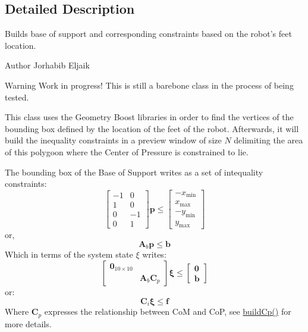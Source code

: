 \subsection{\-Detailed \-Description}
\-Builds base of support and corresponding constraints based on the robot's feet location. 

\begin{DoxyAuthor}{\-Author}
\-Jorhabib \-Eljaik \cite{ibanezThesis2015} 
\end{DoxyAuthor}
\begin{DoxyWarning}{\-Warning}
\-Work in progress! \-This is still a barebone class in the process of being tested.
\end{DoxyWarning}
\-This class uses the \-Geometry \-Boost libraries in order to find the vertices of the bounding box defined by the location of the feet of the robot. \-Afterwards, it will build the inequality constraints in a preview window of size $N$ delimiting the area of this polygoon where the \-Center of \-Pressure is constrained to lie.

\-The bounding box of the \-Base of \-Support writes as a set of intequality constraints\-: \[ \left[\begin{array}{cc} -1 & 0\\ 1 & 0\\ 0 & -1\\ 0 & 1 \end{array}\right] \mathbf{p} \leq \left[\begin{array}{c} -x_{\text{min}}\\ x_{\text{max}}\\ -y_{\text{min}}\\ y_{\text{max}} \end{array}\right] \] or, \[ \mathbf{A}_b\mathbf{p} \leq \mathbf{b} \] \-Which in terms of the system state $\xi$ writes\-: \[ \left[\begin{array}{cc} \mathbf{0}_{10\times10} & \\ & \mathbf{A}_b \mathbf{C}_p \end{array}\right] \mathbf{\xi} \leq \left[\begin{array}{c} \mathbf{0} \\ \mathbf{b} \end{array}\right] \] or\-: \[ \mathbf{C}_i \mathbf{\xi} \leq \mathbf{f} \] \-Where $\mathbf{C}_p$ expresses the relationship between \-Co\-M and \-Co\-P, see \hyperlink{classBaseOfSupport_a7efc6cad789632e88d8c85ab171a9eef}{build\-Cp()} for more details.

